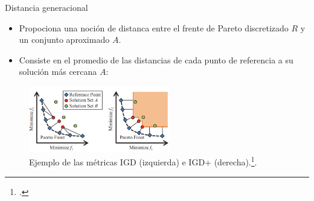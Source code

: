 \documentclass{beamer}
\begin{document}
\begin{frame}{Distancia generacional}
\begin{itemize}
\justifying
\scriptsize
\item Propociona una noción de distanca entre el frente de Pareto discretizado $R$ y un conjunto aproximado $A$.
\item Consiste en el promedio de las distancias de cada punto de referencia a su solución más cercana $A$:
\end{itemize}
\begin{table}[]
\end{table}
\begin{figure}[H]
\centering
\includegraphics[width=0.55\textwidth]{igd.png}
\caption{\scriptsize Ejemplo de las métricas IGD (izquierda) e IGD+ (derecha).\footcite{ishibuchi2016sensitivity}.}
\end{figure}
\end{frame}
\end{document}
